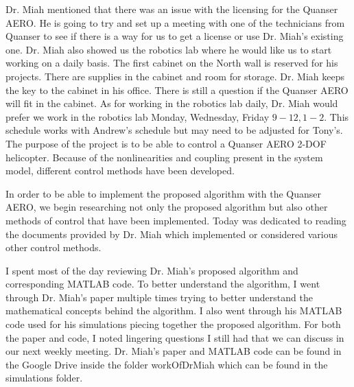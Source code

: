 \documentclass[fontsize=11pt, %
                             paper=letter, %
                             twoside, %
                             captions=tableheading,
                             index=totoc,
                             hyperref]{labbook}
\begin{document}
\begin{addmargin}[0cm]{0cm}
Dr. Miah mentioned that there was an issue with the licensing for the Quanser AERO. He is going to try and set up a meeting with one of the technicians from Quanser to see if there is a way for us to get a license or use Dr. Miah's existing one.
\bigbreak \noindent
Dr. Miah also showed us the robotics lab where he would like us to start working on a daily basis. The first cabinet on the North wall is reserved for his projects. There are supplies in the cabinet and room for storage. Dr. Miah keeps the key to the cabinet in his office. There is still a question if the Quanser AERO will fit in the cabinet.
\bigbreak \noindent
As for working in the robotics lab daily, Dr. Miah would prefer we work in the robotics lab Monday, Wednesday, Friday $9-12, 1-2$. This schedule works with Andrew's schedule but may need to be adjusted for Tony's.
The purpose of the project is to be able to control a Quanser AERO 2-DOF helicopter. Because of the nonlinearities and coupling present in the system model, different control methods have been developed.

In order to be able to implement the proposed algorithm with the Quanser AERO, we begin researching not only the proposed algorithm but also other methods of control that have been implemented. Today was dedicated to reading the documents provided by Dr. Miah which implemented or considered various other control methods. %

I spent most of the day reviewing Dr. Miah's proposed algorithm and corresponding MATLAB code. To better understand the algorithm, I went through Dr. Miah's paper multiple times trying to better understand the mathematical concepts behind the algorithm. I also went through his MATLAB code used for his simulations piecing together the proposed algorithm. For both the paper and code, I noted lingering questions I still had that we can discuss in our next weekly meeting. Dr. Miah's paper and MATLAB code can be found in the Google Drive inside the folder workOfDrMiah which can be found in the simulations folder.


\end{addmargin}
\end{document}
